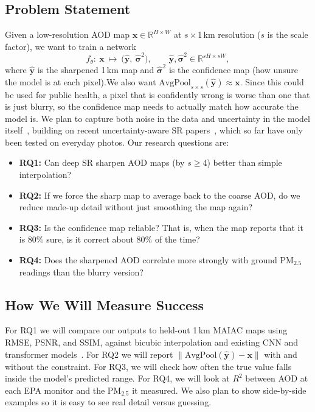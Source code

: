 \documentclass[conference]{IEEEtran}
\begin{document}
\subsection{Problem Statement}
Given a low-resolution AOD map $\mathbf{x}\in\mathbb{R}^{H\times W}$ at $s\times$1\,km resolution ($s$ is the scale factor), we want to train a network
\begin{equation}
f_\theta:\ \mathbf{x}\ \mapsto\ \big(\hat{\mathbf{y}},\ \hat{\boldsymbol{\sigma}}^2\big),\qquad \hat{\mathbf{y}},\hat{\boldsymbol{\sigma}}^2\in\mathbb{R}^{sH\times sW},
\end{equation}
where $\hat{\mathbf{y}}$ is the sharpened 1\,km map and $\hat{\boldsymbol{\sigma}}^2$ is the confidence map (how unsure the model is at each pixel).We also want $\mathrm{AvgPool}_{s \times s}(\hat{\mathbf{y}}) \approx \mathbf{x}$. Since this could be used for public health, a pixel that is confidently wrong is worse than one that is just blurry, so the confidence map needs to actually match how accurate the model is. We plan to capture both noise in the data and uncertainty in the model itself~\cite{kendall2017uncertainties}, building on recent uncertainty-aware SR papers~\cite{he2025buff,zhang2025upsr,csillag2024trust}, which so far have only been tested on everyday photos. Our research questions are:
\begin{itemize}
\item \textbf{RQ1:} Can deep SR sharpen AOD maps (by $s\geq4$) better than simple interpolation?
\item \textbf{RQ2:} If we force the sharp map to average back to the coarse AOD, do we reduce made-up detail without just smoothing the map again?
\item \textbf{RQ3:} Is the confidence map reliable? That is, when the map reports that it is 80\% sure, is it correct about 80\% of the time?
\item \textbf{RQ4:} Does the sharpened AOD correlate more strongly with ground PM$_{2.5}$ readings than the blurry version?
\end{itemize}
\subsection{How We Will Measure Success}
For RQ1 we will compare our outputs to held-out 1\,km MAIAC maps using RMSE, PSNR, and SSIM, against bicubic interpolation and existing CNN and transformer models~\cite{chen2023hat,wang2021survey}. For RQ2 we will report $\|\mathrm{AvgPool}(\hat{\mathbf{y}})-\mathbf{x}\|$ with and without the constraint. For RQ3, we will check how often the true value falls inside the model's predicted range. For RQ4, we will look at $R^2$ between AOD at each EPA monitor and the PM$_{2.5}$ it measured. We also plan to show side-by-side examples so it is easy to see real detail versus guessing.
\end{document}
